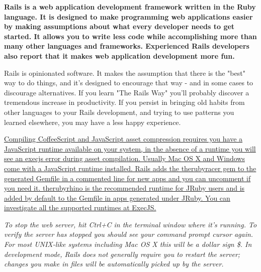 \documentclass[11pt]{report}
\begin{document}
	{\small {\bf Rails is a web application development framework written in the Ruby language. It is designed to make programming web applications easier by making assumptions about what every developer needs to get started. It allows you to write less code while accomplishing more than many other languages and frameworks. Experienced Rails developers also report that it makes web application development more fun.

Rails is opinionated software. It makes the assumption that there is the "best" way to do things, and it's designed to encourage that way - and in some cases to discourage alternatives. If you learn "The Rails Way" you'll probably discover a tremendous increase in productivity. If you persist in bringing old habits from other languages to your Rails development, and trying to use patterns you learned elsewhere, you may have a less happy experience.}}

	\uline{Compiling CoffeeScript and JavaScript asset compression requires you have a JavaScript runtime available on your system, in the absence of a runtime you will see an execjs error during asset compilation. Usually Mac OS X and Windows come with a JavaScript runtime installed. Rails adds the therubyracer gem to the generated Gemfile in a commented line for new apps and you can uncomment if you need it. therubyrhino is the recommended runtime for JRuby users and is added by default to the Gemfile in apps generated under JRuby. You can investigate all the supported runtimes at ExecJS.}

	{\LARGE {\it To stop the web server, hit Ctrl+C in the terminal window where it's running. To verify the server has stopped you should see your command prompt cursor again. For most UNIX-like systems including Mac OS X this will be a dollar sign \$. In development mode, Rails does not generally require you to restart the server; changes you make in files will be automatically picked up by the server.}}
\end{document}
